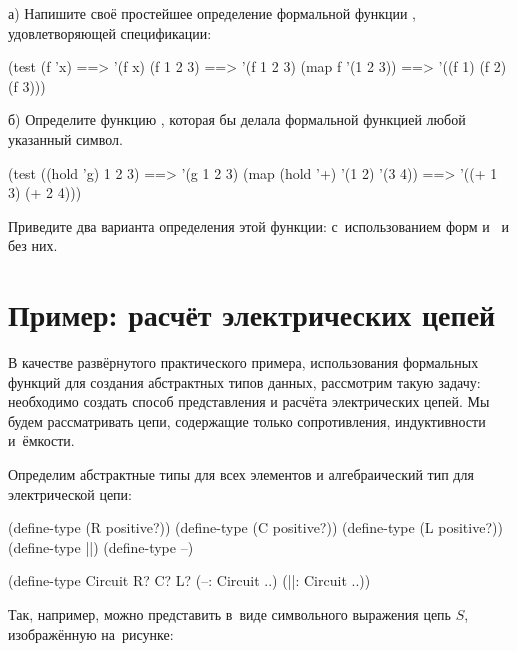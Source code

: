 \begin{Assignment}
а) Напишите своё простейшее определение формальной функции , удовлетворяющей спецификации:
\begin{Specification}
(test 
  (f 'x)                ==> '(f x)
  (f 1 2 3)             ==> '(f 1 2 3)
  (map f '(1 2 3))      ==> '((f 1) (f 2) (f 3)))
\end{Specification}

б) Определите функцию , которая бы делала формальной функцией любой указанный символ. 
\begin{Specification}
(test 
 ((hold 'g) 1 2 3)             ==> '(g 1 2 3)
 (map (hold '+) '(1 2) '(3 4)) ==> '((+ 1 3) (+ 2 4)))
\end{Specification}

Приведите два варианта определения этой функции: с~использованием форм  и~ и без них.

\end{Assignment}


\section{Пример: расчёт электрических цепей}%
В качестве развёрнутого практического примера, использования формальных функций для создания абстрактных типов данных, рассмотрим такую задачу: необходимо создать способ представления и расчёта электрических цепей. Мы будем рассматривать цепи, содержащие только сопротивления, индуктивности и~ёмкости. 

Определим абстрактные типы для всех элементов и алгебраический тип для электрической цепи:
\begin{Definition}
(define-type (R positive?))
(define-type (C positive?))
(define-type (L positive?))
(define-type ||)
(define-type --)

(define-type Circuit
  R? C? L? (--: Circuit ..) (||: Circuit ..))
\end{Definition}
Так, например, можно представить в~виде символьного выражения цепь $S$, изображённую на~рисунке:

